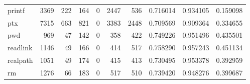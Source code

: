 \begin{tabular}{lrrrrrrrrr}
printf    &                                3369 &                                             222 &                                            164 &                                             0 &                                           2447 &                                          536 &                                           0.716014 &                               0.934105 &                             0.159098 \\
ptx       &                                7315 &                                             663 &                                            821 &                                             0 &                                           3383 &                                         2448 &                                           0.709569 &                               0.909364 &                             0.334655 \\
pwd       &                                 969 &                                              47 &                                            142 &                                             0 &                                            358 &                                          422 &                                           0.749226 &                               0.951496 &                             0.435501 \\
readlink  &                                1146 &                                              49 &                                            166 &                                             0 &                                            414 &                                          517 &                                           0.758290 &                               0.957243 &                             0.451134 \\
realpath  &                                1051 &                                              49 &                                            174 &                                             0 &                                            415 &                                          413 &                                           0.730495 &                               0.953378 &                             0.392959 \\
rm        &                                1276 &                                              66 &                                            183 &                                             0 &                                            517 &                                          510 &                                           0.739420 &                               0.948276 &                             0.399687 \\

\end{tabular}
